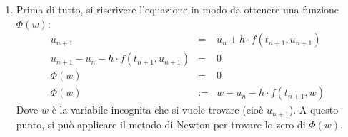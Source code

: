 \begin{itemize}
\begin{enumerate}
        \item Prima di tutto, si riscrivere l'equazione in modo da ottenere una funzione $\Phi(w)$:
        \begin{equation*}
            \begin{array}{rcl}
                u_{n+1} &=& u_{n} + h \cdot f\left(t_{n+1}, u_{n+1}\right) \\[.3em]
                u_{n+1} - u_{n} - h \cdot f\left(t_{n+1}, u_{n+1}\right) &=& 0 \\[.3em]
                \Phi(w) &=& 0 \\[.3em]
                \Phi(w) &:=& w - u_{n} - h \cdot f\left(t_{n+1}, w\right)
            \end{array}
        \end{equation*}
        Dove $w$ è la variabile incognita che si vuole trovare (cioè $u_{n+1}$). A questo punto, si può applicare il metodo di Newton per trovare lo zero di $\Phi(w)$.


\end{enumerate}
\end{itemize}
